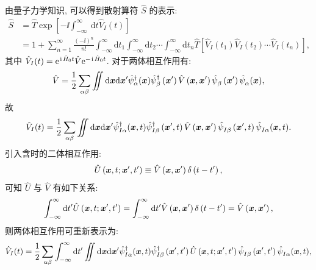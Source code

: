 由量子力学知识, 可以得到散射算符 $\hat{S}$ 的表示:
\begin{align}
\hat{S} &=\hat{T} \exp \left[-\ii \int_{-\infty}^{\infty} \mathrm{~d} t \hat{V}_{I}(t)\right] \nonumber\\
&=1+\sum_{n=1}^{\infty} \frac{(-\ii)^{n}}{n !} \int_{-\infty}^{\infty} \mathrm{d} t_{1} \int_{-\infty}^{\infty} \mathrm{d} t_{2} \cdots \int_{-\infty}^{\infty} \mathrm{d} t_{n} \hat{T}\left[\hat{V}_{I}\left(t_{1}\right) \hat{V}_{I}\left(t_{2}\right) \cdots \hat{V}_{I}\left(t_{n}\right)\right],
\end{align}
其中 $\hat{V}_{I}(t)=\mathrm{e}^{\hspace{0.1em}\mathrm{i}\hspace{0.1em}\hat{H}_{0} t} \hat{V} \mathrm{e}^{-\hspace{0.1em}\mathrm{i}\hspace{0.1em} \hat{H}_{0} t}$. 对于两体相互作用有:
\begin{equation}
\hat{V}=\frac{1}{2} \sum_{\alpha \beta} \iint \mathrm{d} \boldsymbol{x} \mathrm{d} \boldsymbol{x}^{\prime} \hat{\psi}_{\alpha}^{\dagger}(\boldsymbol{x}) \hat{\psi}_{\beta}^{\dagger}\left(\boldsymbol{x}^{\prime}\right) \hat V\left(\boldsymbol{x}, \boldsymbol{x}^{\prime}\right) \hat{\psi}^{}_{\beta}\left(\boldsymbol{x}^{\prime}\right) \hat{\psi}^{}_{\alpha}(\boldsymbol{x}),
\end{equation}
故
\begin{equation}
\hat{V}_{I}(t)=\frac{1}{2} \sum_{\alpha \beta} \iint \mathrm{d} \boldsymbol{x} \mathrm{d} \boldsymbol{x}^{\prime} \hat{\psi}_{I \alpha}^{\dagger}(\boldsymbol{x}, t) \hat{\psi}_{I \beta}^{\dagger}\left(\boldsymbol{x}^{\prime}, t\right) \hat V\left(\boldsymbol{x}, \boldsymbol{x}^{\prime}\right) \hat{\psi}^{}_{I \beta}\left(\boldsymbol{x}^{\prime}, t\right) \hat{\psi}^{}_{I \alpha}(\boldsymbol{x}, t) .
\end{equation}
引入含时的二体相互作用:
\begin{equation}
\hat U\left(\boldsymbol{x}, t ; \boldsymbol{x}^{\prime}, t^{\prime}\right)\equiv\hat V\left(\boldsymbol{x}, \boldsymbol{x}^{\prime}\right) \delta\left(t-t^{\prime}\right) ,
\end{equation}
可知 $\hat U$ 与 $\hat V$ 有如下关系:
\begin{equation}
\int_{-\infty}^{\infty} \mathrm{d} t^{\prime} \hat U\left(\boldsymbol{x}, t ; \boldsymbol{x}^{\prime}, t^{\prime}\right)=\int_{-\infty}^{\infty} \mathrm{d} t^{\prime} \hat V\left(\boldsymbol{x}, \boldsymbol{x}^{\prime}\right) \delta\left(t-t^{\prime}\right)=\hat V\left(\boldsymbol{x}, \boldsymbol{x}^{\prime}\right),
\end{equation}
则两体相互作用可重新表示为:
\begin{equation}
\hat{V}_{I}(t)=\frac{1}{2} \sum_{\alpha \beta} \int_{-\infty}^{\infty} \mathrm{d} t^{\prime} \iint \mathrm{d} \boldsymbol{x} \mathrm{d} \boldsymbol{x}^{\prime} \hat{\psi}_{I \alpha}^{\dagger}(\boldsymbol{x}, t) \hat{\psi}_{I \beta}^{\dagger}\left(\boldsymbol{x}^{\prime}, t^{\prime}\right) \hat U\left(\boldsymbol{x}, t ; \boldsymbol{x}^{\prime}, t^{\prime}\right) \hat{\psi}^{}_{I \beta}\left(\boldsymbol{x}^{\prime}, t^{\prime}\right) \hat{\psi}^{}_{I \alpha}(\boldsymbol{x}, t) ,
\end{equation}
